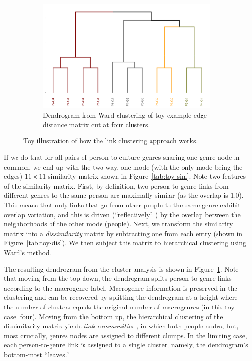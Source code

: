 \documentclass[a4paper,12pt]{extarticle}
\begin{document}
\begin{figure}
\begin{subfigure}[b]{0.6\textwidth}
        \includegraphics[width=1.0\textwidth]{Toy/link-clust-toy.png}
        \caption{Dendrogram from Ward clustering of toy example edge distance matrix cut at four clusters.}
        \label{fig:link-toy}
    \end{subfigure}
    \caption{Toy illustration of how the link clustering approach works.}
    \label{fig:link-toy-ex}
 \end{figure}

If we do that for all pairs of person-to-culture genres sharing one genre node in common, we end up with the two-way, one-mode (with the only mode being the edges) $11 \times 11$ similarity matrix shown in Figure~\ref{tab:toy-sim}. Note two features of the similarity matrix. First, by definition, two person-to-genre links from different genres to the same person are maximally similar (as the overlap is 1.0). This means that only links that go from other people to the same genre exhibit overlap variation, and this is driven (``reflectively'' \citep{lizardo18}) by the overlap between the neighborhoods of the other mode (people). Next, we transform the similarity matrix into a {\em dissimilarity} matrix by subtracting one from each entry (shown in  Figure~\ref{tab:toy-dis}). We then subject this matrix to hierarchical clustering using Ward's \citeyearpar{ward63} method. 

The resulting dendrogram from the cluster analysis is shown in Figure~\ref{fig:link-toy}. Note that moving from the top down, the dendrogram splits person-to-genre links according to the macrogenre label. Macrogenre information is preserved in the clustering and can be recovered by splitting the dendrogram at a height where the number of clusters equals the original number of macrogenres (in this toy case, four). Moving from the bottom up, the hierarchical clustering of the dissimilarity matrix yields {\em link communities} \citep{ahn_etal10}, in which both people nodes, but, most crucially, genres nodes are assigned to different clumps. In the limiting case, each person-to-genre link is assigned to a single cluster, namely, the dendrogram's bottom-most ``leaves.'' 
\end{document}
